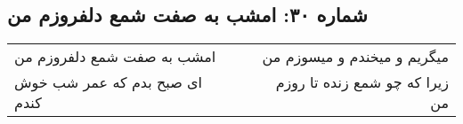 \begin{center}
\section*{شماره ۳۰: امشب به صفت شمع دلفروزم من}
\label{sec:030}
\begin{longtable}{l p{0.5cm} r}
امشب به صفت شمع دلفروزم من
&&
میگریم و میخندم و میسوزم من
\\
ای صبح بدم که عمر شب خوش کندم
&&
زیرا که چو شمع زنده تا روزم من
\\
\end{longtable}
\end{center}
